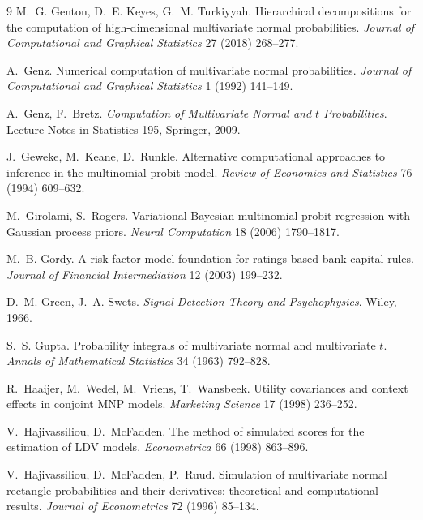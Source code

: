 \documentclass[12pt]{article}
\theoremstyle{remark}
\begin{document}
\begin{thebibliography}{9}
M.~G. Genton, D.~E. Keyes, G.~M. Turkiyyah. Hierarchical decompositions for
the computation of high-dimensional multivariate normal probabilities.
\emph{Journal of Computational and Graphical Statistics} 27 (2018)
268--277.

 A.~Genz. Numerical computation of multivariate normal
probabilities. \emph{Journal of Computational and Graphical
Statistics} 1 (1992)
141--149.

 A.~Genz, F.~Bretz.
\emph{Computation of Multivariate Normal and $t$ Probabilities}. Lecture
Notes in Statistics 195, Springer, 2009.

 J.~Geweke, M.~Keane, D.~Runkle. Alternative computational
approaches to inference in the multinomial probit model. \emph{Review of
Economics and Statistics} 76 (1994) 609--632.

 M.~Girolami,
S.~Rogers. Variational Bayesian multinomial probit regression with
Gaussian process priors. \emph{Neural Computation} 18 (2006) 1790--1817.

 M.~B. Gordy. A risk-factor model
foundation for ratings-based bank capital rules. \emph{Journal of
Financial Intermediation} 12 (2003) 199--232.

 D.~M. Green, J.~A. Swets.
\emph{Signal Detection Theory and Psychophysics}. Wiley, 1966.

 S.~S. Gupta. Probability integrals of
multivariate normal and multivariate $t$. \emph{Annals of Mathematical
Statistics} 34 (1963) 792--828.

 R.~Haaijer, M.~Wedel, M.~Vriens, T.~Wansbeek.
Utility covariances and context effects in conjoint MNP models.
\emph{Marketing Science} 17 (1998) 236--252.

 V.~Hajivassiliou, D.~McFadden. The method of
simulated scores for the estimation of LDV models. \emph{Econometrica} 66
(1998) 863--896.

 V.~Hajivassiliou, D.~McFadden, P.~Ruud. Simulation of
multivariate normal rectangle probabilities and their derivatives:
theoretical and computational results. \emph{Journal of Econometrics} 72
(1996) 85--134.


\end{thebibliography}
\end{document}
